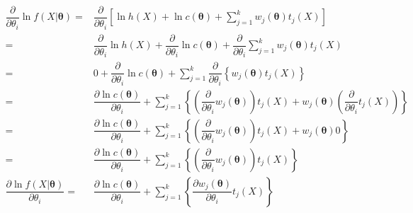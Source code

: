 \documentclass[
]{book}
\theoremstyle{definition}
\theoremstyle{definition}
\theoremstyle{definition}
\theoremstyle{definition}
\theoremstyle{remark}
\begin{document}
\[\begin{aligned}
\dfrac{\partial}{\partial\theta_{{\scriptscriptstyle i}}}\ln f\left(X|\boldsymbol{\theta}\right)= & \dfrac{\partial}{\partial\theta_{{\scriptscriptstyle i}}}\left[\ln h\left(X\right)+\ln c\left(\boldsymbol{\theta}\right)+\sum\limits _{j=1}^{k}w_{{\scriptscriptstyle j}}\left(\boldsymbol{\theta}\right)t_{{\scriptscriptstyle j}}\left(X\right)\right]\\
= & \dfrac{\partial}{\partial\theta_{{\scriptscriptstyle i}}}\ln h\left(X\right)+\dfrac{\partial}{\partial\theta_{{\scriptscriptstyle i}}}\ln c\left(\boldsymbol{\theta}\right)+\dfrac{\partial}{\partial\theta_{{\scriptscriptstyle i}}}\sum\limits _{j=1}^{k}w_{{\scriptscriptstyle j}}\left(\boldsymbol{\theta}\right)t_{{\scriptscriptstyle j}}\left(X\right)\\
= & 0+\dfrac{\partial}{\partial\theta_{{\scriptscriptstyle i}}}\ln c\left(\boldsymbol{\theta}\right)+\sum\limits _{j=1}^{k}\dfrac{\partial}{\partial\theta_{{\scriptscriptstyle i}}}\left\{ w_{{\scriptscriptstyle j}}\left(\boldsymbol{\theta}\right)t_{{\scriptscriptstyle j}}\left(X\right)\right\} \\
= & \dfrac{\partial\ln c\left(\boldsymbol{\theta}\right)}{\partial\theta_{{\scriptscriptstyle i}}}+\sum\limits _{j=1}^{k}\left\{ \left(\dfrac{\partial}{\partial\theta_{{\scriptscriptstyle i}}}w_{{\scriptscriptstyle j}}\left(\boldsymbol{\theta}\right)\right)t_{{\scriptscriptstyle j}}\left(X\right)+w_{{\scriptscriptstyle j}}\left(\boldsymbol{\theta}\right)\left(\dfrac{\partial}{\partial\theta_{{\scriptscriptstyle i}}}t_{{\scriptscriptstyle j}}\left(X\right)\right)\right\} \\
= & \dfrac{\partial\ln c\left(\boldsymbol{\theta}\right)}{\partial\theta_{{\scriptscriptstyle i}}}+\sum\limits _{j=1}^{k}\left\{ \left(\dfrac{\partial}{\partial\theta_{{\scriptscriptstyle i}}}w_{{\scriptscriptstyle j}}\left(\boldsymbol{\theta}\right)\right)t_{{\scriptscriptstyle j}}\left(X\right)+w_{{\scriptscriptstyle j}}\left(\boldsymbol{\theta}\right)0\right\} \\
= & \dfrac{\partial\ln c\left(\boldsymbol{\theta}\right)}{\partial\theta_{{\scriptscriptstyle i}}}+\sum\limits _{j=1}^{k}\left\{ \left(\dfrac{\partial}{\partial\theta_{{\scriptscriptstyle i}}}w_{{\scriptscriptstyle j}}\left(\boldsymbol{\theta}\right)\right)t_{{\scriptscriptstyle j}}\left(X\right)\right\} \\
\dfrac{\partial\ln f\left(X|\boldsymbol{\theta}\right)}{\partial\theta_{{\scriptscriptstyle i}}}= & \dfrac{\partial\ln c\left(\boldsymbol{\theta}\right)}{\partial\theta_{{\scriptscriptstyle i}}}+\sum\limits _{j=1}^{k}\left\{ \dfrac{\partial w_{{\scriptscriptstyle j}}\left(\boldsymbol{\theta}\right)}{\partial\theta_{{\scriptscriptstyle i}}}t_{{\scriptscriptstyle j}}\left(X\right)\right\} \\
\end{aligned}
\]
\end{document}
